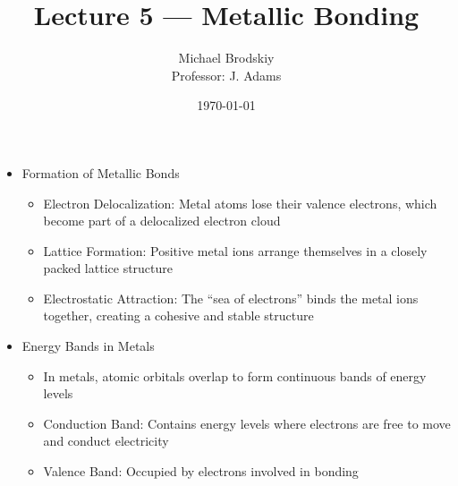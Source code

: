 


\title{Lecture 5 — Metallic Bonding}
\date{\today}
\author{Michael Brodskiy\\ \small Professor: J. Adams}



\maketitle

\begin{itemize}

  \item Formation of Metallic Bonds

    \begin{itemize}

      \item Electron Delocalization: Metal atoms lose their valence electrons, which become part of a delocalized electron cloud

      \item Lattice Formation: Positive metal ions arrange themselves in a closely packed lattice structure

      \item Electrostatic Attraction: The ``sea of electrons'' binds the metal ions together, creating a cohesive and stable structure

    \end{itemize}

  \item Energy Bands in Metals

    \begin{itemize}

      \item In metals, atomic orbitals overlap to form continuous bands of energy levels

      \item Conduction Band: Contains energy levels where electrons are free to move and conduct electricity

      \item Valence Band: Occupied by electrons involved in bonding

    \end{itemize}

\end{itemize}



